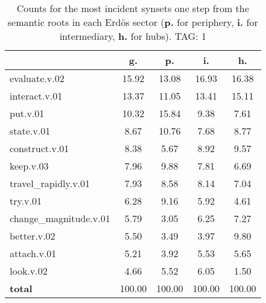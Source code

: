 \begin{table}[h!]
\begin{center}
\begin{tabular}{| l | c | c | c | c |}\hline
 & g. & p. & i. & h. \\\hline
evaluate.v.02 & 15.92  & 13.08  & 16.93  & 16.38 \\\hline
interact.v.01 & 13.37  & 11.05  & 13.41  & 15.11 \\\hline
put.v.01 & 10.32  & 15.84  & 9.38  & 7.61 \\\hline
state.v.01 & 8.67  & 10.76  & 7.68  & 8.77 \\\hline
construct.v.01 & 8.38  & 5.67  & 8.92  & 9.57 \\\hline
keep.v.03 & 7.96  & 9.88  & 7.81  & 6.69 \\\hline
travel\_rapidly.v.01 & 7.93  & 8.58  & 8.14  & 7.04 \\\hline
try.v.01 & 6.28  & 9.16  & 5.92  & 4.61 \\\hline
change\_magnitude.v.01 & 5.79  & 3.05  & 6.25  & 7.27 \\\hline
better.v.02 & 5.50  & 3.49  & 3.97  & 9.80 \\\hline
attach.v.01 & 5.21  & 3.92  & 5.53  & 5.65 \\\hline
look.v.02 & 4.66  & 5.52  & 6.05  & 1.50 \\\hline
{{\bf total}} & 100.00  & 100.00  & 100.00  & 100.00 \\\hline
\end{tabular}
\caption{Counts for the most incident synsets one step from the semantic roots in each Erd\"os sector ({\bf p.} for periphery, {\bf i.} for intermediary, {\bf h.} for hubs). TAG: 1}
\end{center}
\end{table}
